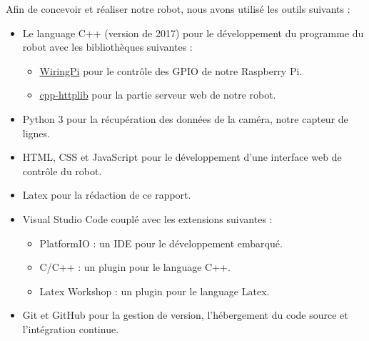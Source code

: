 Afin de concevoir et réaliser notre robot, nous avons utilisé les outils suivants :
\begin{itemize}
    \item Le language C++ (version de 2017) pour le développement du programme du robot avec les bibliothèques suivantes :
    \begin{itemize}
        \item \hyperlink{https://github.com/WiringPi/WiringPi}{WiringPi} pour le contrôle des GPIO de notre Raspberry Pi.
        \item \hyperlink{https://github.com/yhirose/cpp-httplib}{cpp-httplib} pour la partie serveur web de notre robot.
    \end{itemize}
    \item Python 3 pour la récupération des données de la caméra, notre capteur de lignes.
    \item HTML, CSS et JavaScript pour le développement d'une interface web de contrôle du robot.
    \item Latex pour la rédaction de ce rapport.
    \item Visual Studio Code couplé avec les extensions suivantes :
    \begin{itemize}
        \item PlatformIO : un IDE pour le développement embarqué.
        \item C/C++ : un plugin pour le language C++.
        \item Latex Workshop : un plugin pour le language Latex.
    \end{itemize}
    \item Git et GitHub pour la gestion de version, l'hébergement du code source et l'intégration continue.
\end{itemize}
